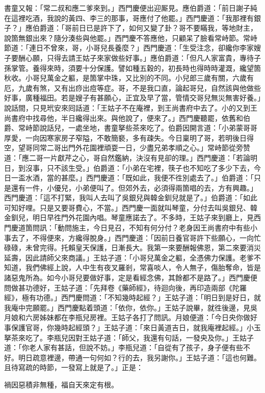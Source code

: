 書童又報：「常二叔和應二爹來到。」西門慶便出迎厮見。應伯爵道：「前日謝子純在這裡吃酒，我說的黃四、李三的那事，哥應付了他罷。」西門慶道：「我那裡有銀子？」應伯爵道：「哥前日已是許下了，如何又變了卦？哥不要瞞我，等地財主，說箇無銀出來？隨分湊些與他罷。」西門慶不答應他，只顧呆了臉看常峙節。{}常峙節道：「連日不曾來，哥，小哥兒長養麼？」西門慶道：「生受注念，卻纔你李家嫂子要酬心願，只得去請王姑子來家做些好事。」應伯爵道：「但凡人家富貴，專待子孫掌管。養得來時，須要十分保護。譬如種五穀的，初長時也得時時灌溉，纔望箇秋收。小哥兒萬金之軀，是箇掌中珠，又比別的不同。小兒郎三歲有關，六歲有厄，九歲有煞，又有出痧出痘等症。哥，不是我口直，論起哥兒，自然該與他做些好事，廣種福田。若是嫂子有甚願心，正宜及早了當，管情交哥兒無災無害好養。」說話間，只見玳安來囘話道：「王姑子不在庵裡，到王尚書府中去了。小的又到王尚書府中找尋他，半日纔得出來。與他說了，便來了。」西門慶聽罷，依舊和伯爵、常峙節說話兒，一處坐地，書童拏些茶來吃了。伯爵因開言道：「小弟蒙哥哥厚愛，一向因寒家房子窄隘，不敢簡褻，多有疎失。今日稟明了哥，若明後日得空，望哥同常二哥出門外花園裡頑耍一日，少盡兄弟孝順之心。」常峙節從旁赞道：「應二哥一片獻芹之心，哥自然鑑納，決沒有見卻的理。」西門慶道：「若論明日，到沒事，只不該生受。」伯爵道：「小弟在宅裡，筷子也不知吃了多少下去，{}今日一盃水酒，當的甚麼。」西門慶道：「既如此，我便不徃別處去了。」伯爵道：「只是還有一件，小優兒，小弟便叫了。但郊外去，必須得兩箇唱的去，方有興趣。」西門慶道：「這不打緊，我叫人去叫了吳銀兒與韓金釧兒就是了。」伯爵道：「如此可知好哩。只是又要哥費心，不當。」西門慶一面就叫琴童，分付去叫吳銀兒、韓金釧兒，明日早徃門外花園內唱。琴童應諾去了。不多時，王姑子來到廳上，見西門慶道箇問訊：「動問施主，今日見召，不知有何分付？老身因王尚書府中有些小事去了，不得便來，方纔得脫身。」西門慶道：「因前日養官哥許下些願心，一向忙碌碌，未曾完得。托賴皇天保護，日漸長大。我第一來要酬報佛恩，第二來要消災延壽，因此請師父來商議。」王姑子道：「小哥兒萬金之軀，全憑佛力保護。老爹不知道，我們佛經上說，人中生有夜叉羅剎，常喜啖人，令人無子，傷胎奪命，皆是諸惡鬼所為。{}如今小哥兒要做好事，定是看經念佛，其餘都不是路了。」西門慶便問做甚功德好，王姑子道：「先拜卷《藥師經》，待迴向後，再印造兩部《陀羅經》，極有功德。」西門慶問道：「不知幾時起經？」王姑子道：「明日到是好日，就我庵中完願罷。」西門慶點着頭道：「依你，依你。」王姑子說畢，就徃後邊，見吳月娘和六房姊妹都在李瓶兒房裡。王姑子各打了問訊。月娘便道：「今日央你做好事保護官哥，你幾時起經頭？」王姑子道：「來日黃道吉日，就我庵裡起經。」小玉拏茶來吃了。李瓶兒因對王姑子道：「師父，我還有句話，一發央及你。」王姑子道：「你老人家有甚話，但說不妨。」李瓶兒道：「自從有了孩子，身子便有些不好。明日疏意裡邊，帶通一句何如？行的去，我另謝你。」王姑子道：「這也何難。且待寫疏的時節，一發寫上就是了。」正是：

禍因惡積非無種，福自天來定有根。


